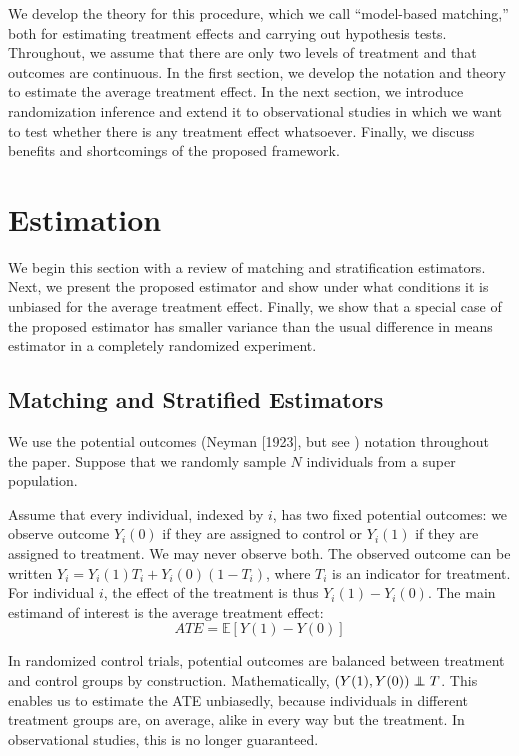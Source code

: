 \documentclass[12pt]{article}
\newcommand{\ex}{\mathbb{E}} %
\newcommand\independent{\protect\mathpalette{\protect\independenT}{\perp}}
\def\independenT#1#2{\mathrel{\rlap{$#1#2$}\mkern2mu{#1#2}}}
\begin{document}
We develop the theory for this procedure, which we call ``model-based matching,'' both for estimating treatment effects and carrying out hypothesis tests.
Throughout, we assume that there are only two levels of treatment and that outcomes are continuous.
In the first section, we develop the notation and theory to estimate the average treatment effect.
In the next section, we introduce randomization inference and extend it to observational studies in which we want to test whether there is any treatment effect whatsoever.
Finally, we discuss benefits and shortcomings of the proposed framework.



\section{Estimation}
We begin this section with a review of matching and stratification estimators.
Next, we present the proposed estimator and show under what conditions it is unbiased for the average treatment effect.
Finally, we show that a special case of the proposed estimator has smaller variance than the usual difference in means estimator in a completely randomized experiment.

\subsection{Matching and Stratified Estimators}
We use the potential outcomes (Neyman [1923], but see \citet{neyman_application_1990}) notation throughout the paper.
Suppose that we randomly sample $N$ individuals from a super population.

Assume that every individual, indexed by $i$, has two fixed potential outcomes:
we observe outcome $Y_i(0)$ if they are assigned to control or $Y_i(1)$ if they are assigned to treatment.
We may never observe both.
The observed outcome can be written $Y_i = Y_i(1)T_i + Y_i(0)(1-T_i)$, where $T_i$ is an indicator for treatment. 
For individual $i$, the effect of the treatment is thus $Y_i(1) - Y_i(0)$.
The main estimand of interest is the average treatment effect:
$$ATE= \ex\left[ Y(1) - Y(0) \right]$$

In randomized control trials, potential outcomes are balanced between treatment and control groups by construction.
Mathematically, $(Y(1), Y(0)) \independent T$.
This enables us to estimate the ATE unbiasedly, because individuals in different treatment groups are, on average, alike in every way but the treatment.
In observational studies, this is no longer guaranteed. 
\end{document}
